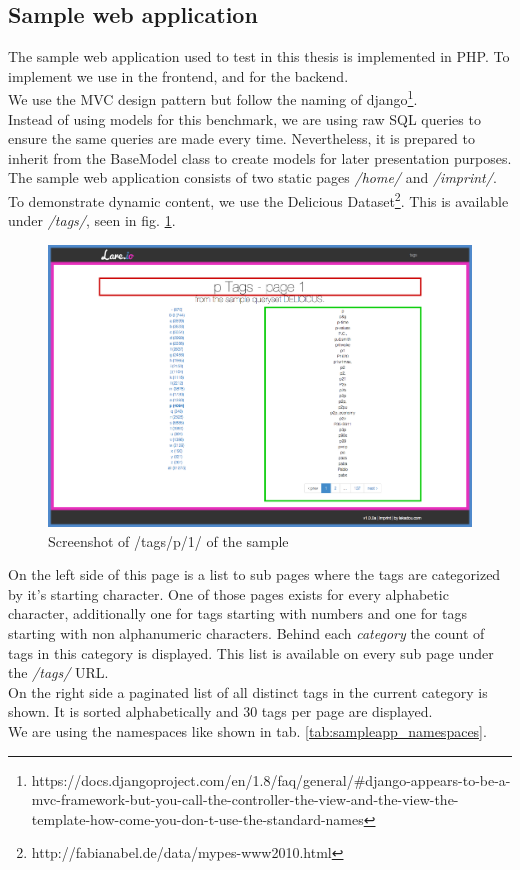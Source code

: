 \subsection{Sample web application}

The sample web application used to test \lare{} in this thesis is implemented in PHP.
To implement \lare{} we use \lareJS{} in the frontend, \twigLare{} and \phpLare{} for the backend.
\\
We use the MVC design pattern but follow the naming of django\footnote{https://docs.djangoproject.com/en/1.8/faq/general/\#django-appears-to-be-a-mvc-framework-but-you-call-the-controller-the-view-and-the-view-the-template-how-come-you-don-t-use-the-standard-names}.
\\
Instead of using models for this benchmark, we are using raw SQL queries to ensure the same queries are made every time.
Nevertheless, it is prepared to inherit from the BaseModel class to create models for later presentation purposes.
\\
The sample web application consists of two static pages \emph{/home/} and \emph{/imprint/}.
\\
To demonstrate dynamic content, we use the Delicious Dataset\footnote{http://fabianabel.de/data/mypes-www2010.html}.
This is available under \emph{/tags/}, seen in fig. \ref{fig:lare_tags}.
\begin{figure}[H]
\centering 
\includegraphics[width=14cm]{images/lare_p_1.png}
\caption[lare_tags]{Screenshot of /tags/p/1/ of the sample \webApplication{}}
\label{fig:lare_tags}
\end{figure}

\noindent{}On the left side of this page is a list to sub pages where the tags are categorized by it's starting character.
One of those pages exists for every alphabetic character, additionally one for tags starting with numbers and one for tags starting with non alphanumeric characters.
Behind each \emph{category} the count of tags in this category is displayed.
This list is available on every sub page under the \emph{/tags/} URL.
\\
On the right side a paginated list of all distinct tags in the current category is shown.
It is sorted alphabetically and 30 tags per page are displayed.
\\
We are using the namespaces like shown in tab. \ref{tab:sampleapp_namespaces}.

